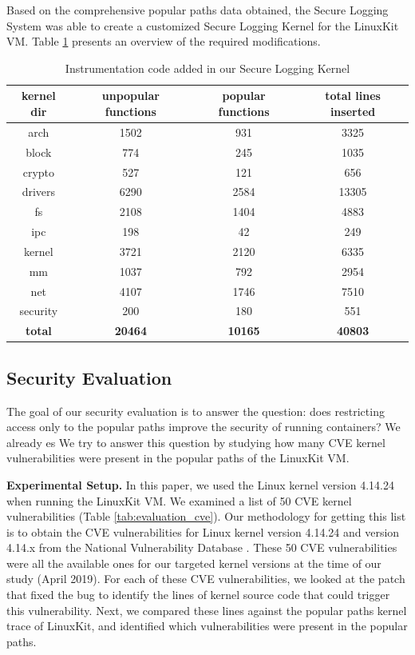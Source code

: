 Based on the comprehensive popular paths data obtained, the Secure Logging System was able to create a customized Secure Logging Kernel for the LinuxKit VM. 
Table \ref{tab:kernel_instrumentation} presents an overview of the required modifications. 

\begin{table}[h!]
\begin{center}
\caption{Instrumentation code added in our Secure Logging Kernel}
\label{tab:kernel_instrumentation}
\begin{tabular}{c|c|c|c}
 kernel dir & unpopular functions & popular functions & total lines inserted \\
 \hline
 arch & 1502 & 931 & 3325 \\
 \hline
 block & 774 & 245 & 1035 \\
 \hline
 crypto & 527 & 121 & 656 \\ 
 \hline
 drivers & 6290 & 2584 & 13305 \\
 \hline
 fs & 2108 & 1404 & 4883 \\
 \hline
 ipc & 198 & 42 & 249 \\
 \hline
 kernel & 3721 & 2120 & 6335 \\
 \hline
 mm & 1037 & 792 & 2954 \\
 \hline
 net & 4107 & 1746 & 7510 \\
 \hline
 security & 200 & 180 & 551 \\
 \hline
 \textbf{total} & \textbf{20464} & \textbf{10165} & \textbf{40803} \\
\end{tabular}
\end{center}
\end{table}

\subsection{Security Evaluation}
\label{sec.evaluation.security} 
The goal of our security evaluation is to answer the question: does restricting access only to the popular paths improve the security of running containers? 
We already es
We try to answer this question by studying how many CVE kernel vulnerabilities were present in the popular paths of the LinuxKit VM. 

\textbf{Experimental Setup.}
In this paper, we used the Linux kernel version 4.14.24 when running the LinuxKit VM. 
We examined a list of 50 CVE kernel vulnerabilities (Table \ref{tab:evaluation_cve}). 
Our methodology for getting this list is to obtain the CVE vulnerabilities for Linux kernel version 4.14.24 and version 4.14.x from the National Vulnerability Database \cite{NVD}. 
These 50 CVE vulnerabilities were all the available ones for our targeted kernel versions at the time of our study (April 2019). 
For each of these CVE vulnerabilities, we looked at the patch that fixed the bug to identify the lines of kernel source code that could trigger this vulnerability. 
Next, we compared these lines against the popular paths kernel trace of LinuxKit, and identified which vulnerabilities were present in the popular paths. 

